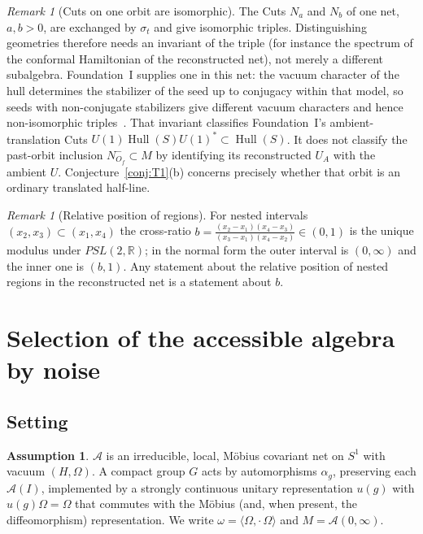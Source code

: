 \documentclass[12pt]{article}
\theoremstyle{definition}
\newtheorem{assumption}[theorem]{Assumption}
\theoremstyle{remark}
\newtheorem{remark}[theorem]{Remark}
\begin{document}
\begin{remark}[Cuts on one orbit are isomorphic]
The Cuts \(N_a\) and \(N_b\) of one net, \(a,b>0\), are exchanged by
\(\sigma_t\) and give isomorphic triples. Distinguishing geometries therefore needs an
invariant of the triple (for instance the spectrum of the conformal Hamiltonian of the
reconstructed net), not merely a different subalgebra. Foundation~I supplies one in this
net: the vacuum character of the hull determines the stabilizer of the seed up to
conjugacy within that model, so seeds with non-conjugate stabilizers give
different vacuum characters and hence non-isomorphic triples~\cite{FoundationI}.
That invariant classifies Foundation~I's ambient-translation Cuts
$U(1)\operatorname{Hull}(S)U(1)^*\subset\operatorname{Hull}(S)$.
It does not classify the past-orbit inclusion $N^-_{O_f}\subset M$
by identifying its reconstructed $U_A$ with the ambient $U$.
Conjecture~\ref{conj:T1}(b) concerns precisely whether that orbit
is an ordinary translated half-line.
\end{remark}

\begin{remark}[Relative position of regions]
For nested intervals \((x_2,x_3)\subset(x_1,x_4)\) the cross-ratio
\(b=\frac{(x_2-x_1)(x_4-x_3)}{(x_3-x_1)(x_4-x_2)}\in(0,1)\) is the unique
modulus under \(PSL(2,\mathbb R)\); in the normal form the outer interval is
\((0,\infty)\) and the inner one is \((b,1)\). Any statement about the relative position of nested regions in the reconstructed net is a statement about \(b\).
\end{remark}

\section{Selection of the accessible algebra by noise}\label{sec:noise}

\subsection{Setting}

\begin{assumption}\label{ass:G}
\(\mathcal A\) is an irreducible, local, M\"obius covariant net on \(S^1\) with
vacuum \((H,\Omega)\). A compact group \(G\) acts by automorphisms \(\alpha_g\),
preserving each \(\mathcal A(I)\), implemented by a strongly continuous unitary
representation \(u(g)\) with \(u(g)\Omega=\Omega\) that commutes with the M\"obius
(and, when present, the diffeomorphism) representation. We write
\(\omega=\langle\Omega,\cdot\,\Omega\rangle\) and \(M=\mathcal A(0,\infty)\).
\end{assumption}
\end{document}

